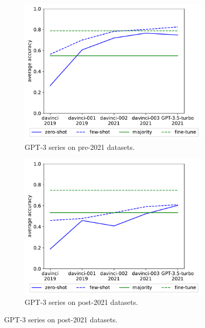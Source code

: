 \documentclass[letterpaper]{article} %
\begin{document}
\begin{figure}[t]
        \centering
        \begin{subfigure}[b]{0.475\textwidth}
            \centering
            \includegraphics[scale=0.45]{img/output-zero-few-shot-old-dataset.pdf}
            \caption[]%
            {{GPT-3 series on pre-2021 datasets.}}
            \label{fig:GPT-old-datasets}
        \end{subfigure}
        \begin{subfigure}[b]{0.475\textwidth}
            \centering
            \includegraphics[scale=0.45]{img/output-zero-few-shot-new-dataset.pdf}
            \caption[]%
            {{GPT-3 series on post-2021 datasets.}}

\end{subfigure}
\end{figure}
\end{document}
